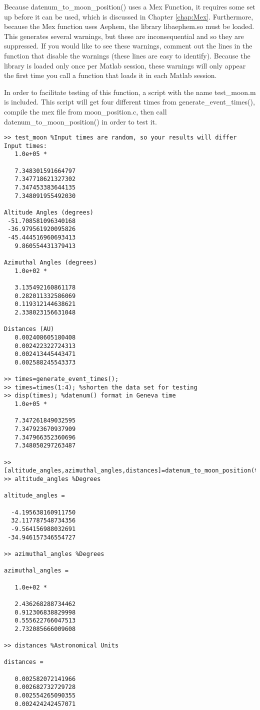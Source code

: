 \documentclass[12pt]{report}
\begin{document}
Because datenum\_to\_moon\_position() uses a Mex Function, it requires some set up before it can be used, which is discussed in Chapter \ref{chap:Mex}.  Furthermore, because the Mex function uses Aephem, the library libaephem.so must be loaded.  This generates several warnings, but these are inconsequential and so they are suppressed.  If you would like to see these warnings, comment out the lines in the function that disable the warnings (these lines are easy to identify).  Because the library is loaded only once per Matlab session, these warnings will only appear the first time you call a function that loads it in each Matlab session.

In order to facilitate testing of this function, a script with the name test\_moon.m is included.  This script will get four different times from generate\_event\_times(), compile the mex file from moon\_position.c, then call datenum\_to\_moon\_position() in order to test it.

\begin{verbatim}
>> test_moon %Input times are random, so your results will differ
Input times:
   1.0e+05 *

   7.348301591664797
   7.347718621327302
   7.347453383644135
   7.348091955492030

Altitude Angles (degrees)
 -51.708581096340168
 -36.979561920095826
 -45.444516960693413
   9.860554431379413

Azimuthal Angles (degrees)
   1.0e+02 *

   3.135492160861178
   0.282011332586069
   0.119312144638621
   2.338023156631048

Distances (AU)
   0.002408605180408
   0.002422322724313
   0.002413445443471
   0.002588245543373

>> times=generate_event_times();
>> times=times(1:4); %shorten the data set for testing
>> disp(times); %datenum() format in Geneva time
   1.0e+05 *

   7.347261849032595
   7.347923670937909
   7.347966352360696
   7.348050297263487

>> [altitude_angles,azimuthal_angles,distances]=datenum_to_moon_position(times);
>> altitude_angles %Degrees

altitude_angles =

  -4.195638160911750
  32.117787548734356
  -9.564156988032691
 -34.946157346554727

>> azimuthal_angles %Degrees

azimuthal_angles =

   1.0e+02 *

   2.436268288734462
   0.912306838829998
   0.555622766047513
   2.732085666009608

>> distances %Astronomical Units

distances =

   0.002582072141966
   0.002682732729728
   0.002554265090355
   0.002424242457071
\end{verbatim}
\end{document}
